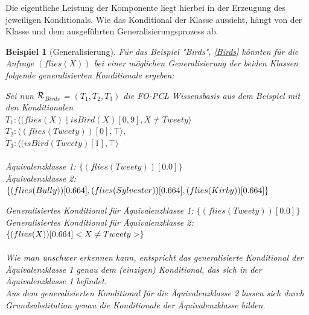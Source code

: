 \documentclass[draft]{scrreprt}
\newtheorem{Bsp}{Beispiel}[section]
\begin{document}
Die eigentliche Leistung der Komponente liegt hierbei in der Erzeugung des jeweiligen Konditionals. Wie das Konditional der Klasse aussieht, hängt von der Klasse und dem ausgeführten Generalisierungsprozess ab. 
\begin{Bsp}[Generalisierung]\label{Bsp:Generalisierung}
Für das Beispiel "{}Birds"{}, \ref{Birds} könnten für die Anfrage $ (flies(X)) $ bei einer möglichen Generalisierung der beiden Klassen folgende generalisierten Konditionale ergeben: 


\noindent
Sei nun $ \cal{R} $$_{Birds}  $ = $ (T_1, T_2, T_3)  $ die FO-PCL Wissensbasis aus dem Beispiel mit den Konditionalen
\\
$ T_{1} : \langle (flies(X) \mid isBird(X)[0,9], X \neq Tweety \rangle$\\	
$ T_{2}  :  \langle (flies(Tweety))[0], \top \rangle $,\\
$ T_{3} : \langle (isBird(Tweety) [1], \top \rangle$\\
\\
Äquivalenzklasse 1: $\{(flies(Tweety))[0.0]\}$\\
Äquivalenzklasse 2: $\{(flies(Bully))[0.664], (flies(Sylvester))[0.664], \\(flies(Kirby))[0.664]\}$

\noindent
Generalisiertes Konditional für Äquivalenzklasse 1: $\{(flies(Tweety))[0.0]\}$\\
Generalisiertes Konditional für Äquivalenzklasse 2: $\{(flies(X))[0.664] \\ <X\neq Tweety>\}$\\
\\
Wie man unschwer erkennen kann, entspricht das generalisierte Konditional der Äquivalenzklasse 1 genau dem (einzigen) Konditional, das sich in der Äquivalenzklasse 1 befindet.\\
Aus dem generalisierten Konditional für die Äquivalenzklasse 2 lassen sich durch Grundsubstitution genau die Konditionale der Äquivalenzklasse bilden.
\end{Bsp}
\end{document}
